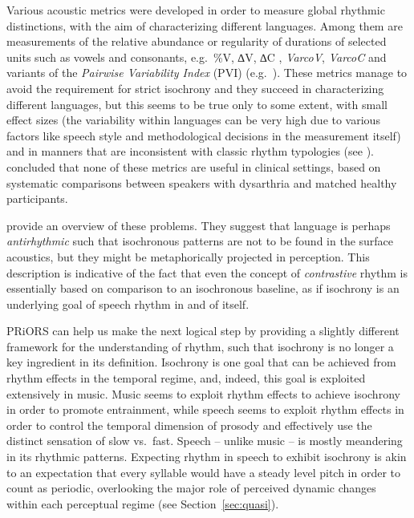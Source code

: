 Various acoustic metrics were developed in order to measure global rhythmic distinctions, with the aim of characterizing different languages. Among them are measurements of the relative abundance or regularity of durations of selected units such as vowels and consonants, e.g.~\%V, ∆V, ∆C \citep{ramus1999correlates}, \emph{VarcoV}, \emph{VarcoC} \citep{dellwo2006rhythmsk} and variants of the \emph{Pairwise Variability Index} (PVI) (e.g.~\citealt{grabe2002durational}).
These metrics manage to avoid the requirement for strict isochrony and they succeed in characterizing different languages, but this seems to be true only to some extent, with small effect sizes (the variability within languages can be very high due to various factors like speech style and methodological decisions in the measurement itself) and in manners that are inconsistent with classic rhythm typologies
(see \citealt{arvaniti2012usefulness}). \citet{lowit2014quantification} concluded that none of these metrics are useful in clinical settings, based on systematic comparisons between speakers with dysarthria and matched healthy participants.

\citet{nolan2014speechsk} provide an overview of these problems. They suggest that language is perhaps \emph{antirhythmic} such that isochronous patterns are not to be found in the surface acoustics, but they might be metaphorically projected in perception. This description is indicative of the fact that even the concept of \emph{contrastive} rhythm is essentially based on comparison to an isochronous baseline, as if isochrony is an underlying goal of speech rhythm in and of itself.

PRiORS can help us make the next logical step by providing a slightly different framework for the understanding of rhythm, such that isochrony is no longer a key ingredient in its definition. Isochrony is one goal that can be achieved from rhythm effects in the temporal regime, and, indeed, this goal is exploited extensively in music.
Music seems to exploit rhythm effects to achieve isochrony in order to promote entrainment, while speech seems to exploit rhythm effects in order to control the temporal dimension of prosody and effectively use the distinct sensation of slow vs.~fast.
Speech -- unlike music -- is mostly meandering in its rhythmic patterns.
Expecting rhythm in speech to exhibit isochrony is akin to an expectation that every syllable would have a steady level pitch in order to count as periodic,
overlooking the major role
of perceived dynamic changes within each perceptual regime
(see Section~\ref{sec:quasi}).

